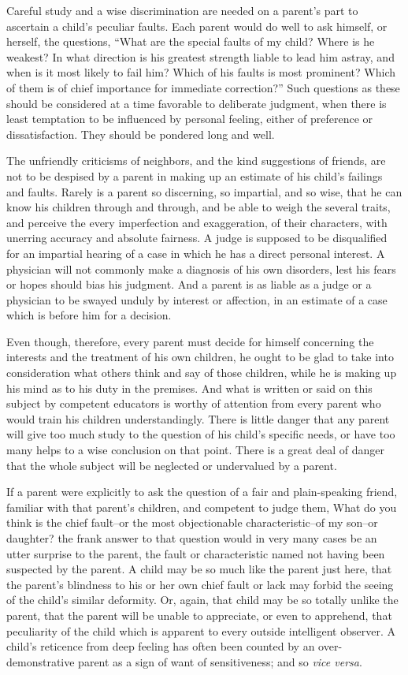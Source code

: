\documentclass[
]{book}
\begin{document}
Careful study and a wise discrimination are needed on a parent's part to ascertain a child's peculiar faults. Each parent would do well to ask himself, or herself, the questions, ``What are the special faults of my child? Where is he weakest? In what direction is his greatest strength liable to lead him astray, and when is it most likely to fail him? Which of his faults is most prominent? Which of them is of chief importance for immediate correction?'' Such questions as these should be considered at a time favorable to deliberate judgment, when there is least temptation to be influenced by personal feeling, either of preference or dissatisfaction. They should be pondered long and well.

The unfriendly criticisms of neighbors, and the kind suggestions of friends, are not to be despised by a parent in making up an estimate of his child's failings and faults. Rarely is a parent so discerning, so impartial, and so wise, that he can know his children through and through, and be able to weigh the several traits, and perceive the every imperfection and exaggeration, of their characters, with unerring accuracy and absolute fairness. A judge is supposed to be disqualified for an impartial hearing of a case in which he has a direct personal interest. A physician will not commonly make a diagnosis of his own disorders, lest his fears or hopes should bias his judgment. And a parent is as liable as a judge or a physician to be swayed unduly by interest or affection, in an estimate of a case which is before him for a decision.

Even though, therefore, every parent must decide for himself concerning the interests and the treatment of his own children, he ought to be glad to take into consideration what others think and say of those children, while he is making up his mind as to his duty in the premises. And what is written or said on this subject by competent educators is worthy of attention from every parent who would train his children understandingly. There is little danger that any parent will give too much study to the question of his child's specific needs, or have too many helps to a wise conclusion on that point. There is a great deal of danger that the whole subject will be neglected or undervalued by a parent.

If a parent were explicitly to ask the question of a fair and plain-speaking friend, familiar with that parent's children, and competent to judge them, What do you think is the chief fault--or the most objectionable characteristic--of my son--or daughter? the frank answer to that question would in very many cases be an utter surprise to the parent, the fault or characteristic named not having been suspected by the parent. A child may be so much like the parent just here, that the parent's blindness to his or her own chief fault or lack may forbid the seeing of the child's similar deformity. Or, again, that child may be so totally unlike the parent, that the parent will be unable to appreciate, or even to apprehend, that peculiarity of the child which is apparent to every outside intelligent observer. A child's reticence from deep feeling has often been counted by an over-demonstrative parent as a sign of want of sensitiveness; and so \emph{vice versa}.
\end{document}
